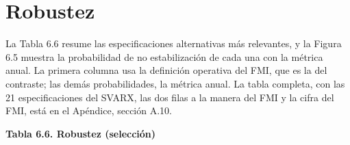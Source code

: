 \section{Robustez}

La Tabla 6.6 resume las especificaciones alternativas más relevantes, y
la Figura 6.5 muestra la probabilidad de no estabilización de cada una
con la métrica anual. La primera columna usa la definición operativa del
FMI, que es la del contraste; las demás probabilidades, la métrica
anual. La tabla completa, con las 21 especificaciones del SVARX, las dos
filas a la manera del FMI y la cifra del FMI, está en el Apéndice,
sección A.10.

\textbf{Tabla 6.6. Robustez (selección)}

